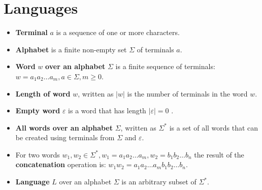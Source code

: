 \documentclass{ctuthesis}
\begin{document}
\section{Languages}
\label{sec:languages-def}
\begin{itemize}
	\item \textbf{Terminal} $a$ is a sequence of one or more characters.
	\item \textbf{Alphabet} is a finite non-empty set $\Sigma$ of terminals $a$.
	\item \textbf{Word} $w$ \textbf{over an alphabet} $\Sigma$ is a finite sequence of terminals: $w = a_1a_2\ldots a_m, a \in \Sigma, m \geq 0$.
	\item \textbf{Length of word} $w$, written as $|w|$ is the number of terminals in the word $w$.
	\item \textbf{Empty word} $\varepsilon$ is a word that has length $|\varepsilon| = 0$ .
	\item \textbf{All words over an alphabet} $\Sigma$, written as $\Sigma^*$ is a set of all words that can be created using terminals from $\Sigma$ and $\varepsilon$.
	\item For two words $w_1, w_2 \in \Sigma^*, w_1 = a_1a_2\ldots a_m, w_2 = b_1b_2\ldots b_n$ the result of the \textbf{concatenation} operation is: $w_1w_2 = a_1a_2\ldots a_mb_1b_2\ldots b_n$.
	\item \textbf{Language} $L$ over an alphabet $\Sigma$ is an arbitrary subset of $\Sigma^*$.
\end{itemize}
\end{document}
